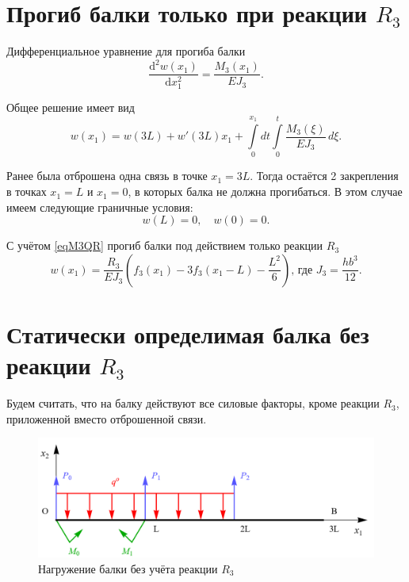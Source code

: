 \documentclass[12pt, a4paper]{article}
\begin{document}
	\section{Прогиб балки только при реакции $R_3$} 
	
	Дифференциальное уравнение для прогиба балки
	\[
	\dfrac{\mathrm{d}^2 w(x_1)}{\mathrm{d} x_1^2} = \dfrac{M_3(x_1)}{E J_3}.
	\]
	
	Общее решение имеет вид
	\vspace{-0.5em}
	\begin{equation}
		w(x_1) = w(3L) + w'(3L) x_1 + \int\limits_0^{x_1} \! dt \int\limits_0^t \dfrac{M_3(\xi)}{E J_3} \, d \xi.
		\label{eqw}
	\end{equation}
	
	Ранее была отброшена одна связь в точке $x_1 = 3L$. Тогда остаётся 2 закрепления в точках $x_1 = L$ и $x_1 = 0$, в которых балка не должна прогибаться. В этом случае имеем следующие граничные условия:
	\vspace{-0.5em}
	\begin{equation}
		w(L) = 0, \quad w(0) = 0.
		\label{eqwGU}
	\end{equation}
	
	\vspace{-0.5em}
	
	С учётом \eqref{eqM3QR} прогиб балки под действием только реакции $R_3$
	\begin{equation}
		w(x_1) = \dfrac{R_3}{E J_3} \left( f_3(x_1) - 3 f_3(x_1 - L) - \dfrac{L^2}{6} \right) \text{, где } J_3 = \frac{h b^3}{12}.
		\label{eqwR3}
	\end{equation}
	
	\newpage
	
	\section{Статически определимая балка без реакции $R_3$} 
	
	Будем считать, что на балку действуют все силовые факторы, кроме реакции $R_3$, приложенной вместо отброшенной связи.
	
	\begin{figure}[!h]
		\centering
		\includegraphics[width=0.75\linewidth]{plot-7}
		\caption{Нагружение балки без учёта реакции $R_3$}
	\end{figure}
	
\end{document}
